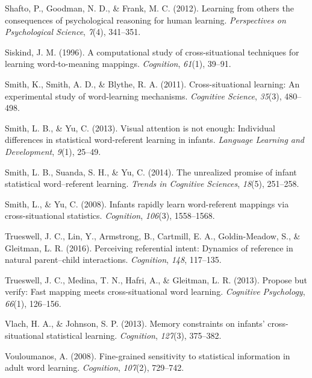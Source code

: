 \documentclass[authoryear, review]{elsarticle}
\begin{document}
\hypertarget{ref-shafto2012learning}{}
Shafto, P., Goodman, N. D., \& Frank, M. C. (2012). Learning from others
the consequences of psychological reasoning for human learning.
\emph{Perspectives on Psychological Science}, \emph{7}(4), 341--351.

\hypertarget{ref-siskind1996computational}{}
Siskind, J. M. (1996). A computational study of cross-situational
techniques for learning word-to-meaning mappings. \emph{Cognition},
\emph{61}(1), 39--91.

\hypertarget{ref-smith2011cross}{}
Smith, K., Smith, A. D., \& Blythe, R. A. (2011). Cross-situational
learning: An experimental study of word-learning mechanisms.
\emph{Cognitive Science}, \emph{35}(3), 480--498.

\hypertarget{ref-smith2013visual}{}
Smith, L. B., \& Yu, C. (2013). Visual attention is not enough:
Individual differences in statistical word-referent learning in infants.
\emph{Language Learning and Development}, \emph{9}(1), 25--49.

\hypertarget{ref-smith2014unrealized}{}
Smith, L. B., Suanda, S. H., \& Yu, C. (2014). The unrealized promise of
infant statistical word--referent learning. \emph{Trends in Cognitive
Sciences}, \emph{18}(5), 251--258.

\hypertarget{ref-smith2008infants}{}
Smith, L., \& Yu, C. (2008). Infants rapidly learn word-referent
mappings via cross-situational statistics. \emph{Cognition},
\emph{106}(3), 1558--1568.

\hypertarget{ref-trueswell2016perceiving}{}
Trueswell, J. C., Lin, Y., Armstrong, B., Cartmill, E. A.,
Goldin-Meadow, S., \& Gleitman, L. R. (2016). Perceiving referential
intent: Dynamics of reference in natural parent--child interactions.
\emph{Cognition}, \emph{148}, 117--135.

\hypertarget{ref-trueswell2013propose}{}
Trueswell, J. C., Medina, T. N., Hafri, A., \& Gleitman, L. R. (2013).
Propose but verify: Fast mapping meets cross-situational word learning.
\emph{Cognitive Psychology}, \emph{66}(1), 126--156.

\hypertarget{ref-vlach2013memory}{}
Vlach, H. A., \& Johnson, S. P. (2013). Memory constraints on infants'
cross-situational statistical learning. \emph{Cognition}, \emph{127}(3),
375--382.

\hypertarget{ref-vouloumanos2008fine}{}
Vouloumanos, A. (2008). Fine-grained sensitivity to statistical
information in adult word learning. \emph{Cognition}, \emph{107}(2),
729--742.
\end{document}
